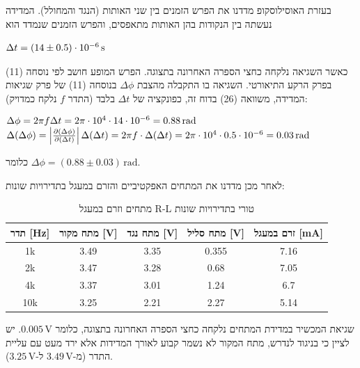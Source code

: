 \documentclass[14pt]{extarticle}
\makeatletter
\newenvironment{lefteqs}{%
    \begin{english}%
    \begin{flushleft}%
    \renewcommand{\arraystretch}{1.3}%
    $\begin{array}{@{}l@{}}%
}{%
    \end{array}$%
    \end{flushleft}%
    \end{english}%
}
\makeatother
\begin{document}
בעזרת האוסילוסקופ מדדנו את הפרש הזמנים בין שני האותות (הנגד והמחולל).
המדידה נעשתה בין הנקודות בהן האותות מתאפסים, והפרש הזמנים שנמדד הוא 
\begin{lefteqs}
\Delta t = (14 \pm 0.5) \cdot 10^{-6}\,\text{s}
\end{lefteqs}
כאשר השגיאה נלקחה כחצי הספרה האחרונה בתצוגה.
הפרש המופע חושב לפי נוסחה (11) בפרק הרקע התיאורטי. השגיאה בו התקבלה מהצבת $\Delta\phi$ בנוסחה (11) של פרק שגיאות המדידה, משוואה (26) בדוח זה, כפונקציה של $\Delta t$ בלבד (התדר $f$ נלקח כמדויק):
\begin{lefteqs}
    \Delta \phi = 2 \pi f \Delta t = 2 \pi \cdot 10^4 \cdot 14 \cdot 10^{-6} = 0.88\,\text{rad} \\
    \Delta(\Delta\phi) = \left|\frac{\partial(\Delta\phi)}{\partial(\Delta t)}\right|\Delta(\Delta t) = 2\pi f \cdot \Delta(\Delta t) = 2\pi \cdot 10^4 \cdot 0.5 \cdot 10^{-6} = 0.03\,\text{rad}
\end{lefteqs}
כלומר $\Delta\phi = (0.88 \pm 0.03)\,\text{rad}$.

לאחר מכן מדדנו את המתחים האפקטיביים והזרם במעגל בתדירויות שונות:
\begin{table}[H]
    \centering
    \begin{tabular}{|c|c|c|c|c|}
        \hline
        תדר [Hz] & מתח מקור [V] & מתח נגד [V] & מתח סליל [V] & זרם במעגל [mA] \\
        \hline
        1k & 3.49 & 3.35 & 0.355 & 7.16 \\
        2k & 3.47 & 3.28 & 0.68 & 7.05 \\
        4k & 3.37 & 3.01 & 1.24 & 6.7 \\
        10k & 3.25 & 2.21 & 2.27 & 5.14 \\
        \hline
    \end{tabular}
    \caption{מתחים וזרם במעגל R-L טורי בתדירויות שונות}
\end{table}
שגיאת המכשיר במדידת המתחים נלקחה כחצי הספרה האחרונה בתצוגה, כלומר $0.005\,\text{V}$.
יש לציין כי בניגוד לנדרש, מתח המקור לא נשמר קבוע לאורך המדידות אלא ירד מעט עם עליית התדר (מ-$3.49\,\text{V}$ ל-$3.25\,\text{V}$).
\end{document}
